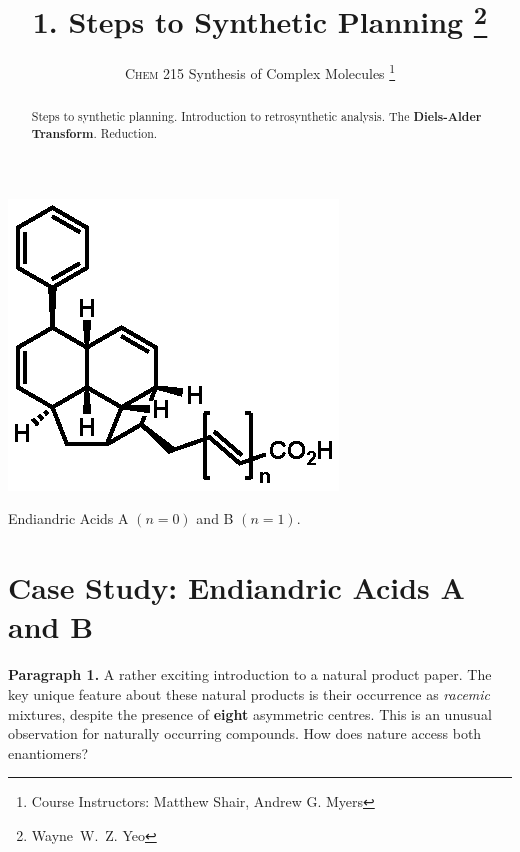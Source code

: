 \documentclass[a4paper]{tufte-handout}
\title{1. Steps to Synthetic Planning \thanks{Wayne~W.~Z. Yeo}}
\author[MIT 5.60]{\textsc{Chem 215} Synthesis of Complex Molecules \thanks{Course Instructors: Matthew Shair, Andrew G. Myers}}
\begin{document}
\maketitle %

\begin{abstract}
\noindent
Steps to synthetic planning. Introduction to retrosynthetic analysis. The \textbf{Diels-Alder Transform}. Reduction.
\end{abstract}


\begin{marginfigure}%
  \includegraphics[width=\linewidth]{endiandric-acids}
  \caption{Endiandric Acids A $(n = 0)$ and B $(n = 1)$.}
  \label{fig:endiandric}
\end{marginfigure}

\section*{Case Study: Endiandric Acids A and B}
\textbf{Paragraph 1.} A rather exciting introduction to a natural product paper. The key unique feature about these natural products is their occurrence as \textit{racemic} mixtures, despite the presence of
\textbf{eight} asymmetric centres. This is an unusual observation for naturally occurring compounds. How does nature
access both enantiomers? 
\end{document}
